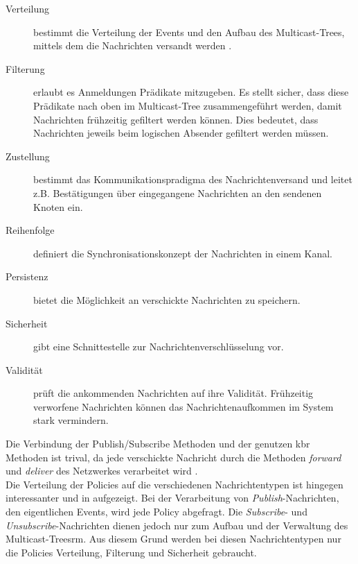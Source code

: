 \begin{description}
\item[Verteilung] bestimmt die Verteilung der Events und den Aufbau des Multicast-Trees, mittels dem die Nachrichten versandt werden \cite{KostasKatrinis2005}.
\item[Filterung] erlaubt es Anmeldungen Prädikate mitzugeben. Es stellt sicher, dass diese Prädikate nach oben im Multicast-Tree zusammengeführt werden, damit Nachrichten frühzeitig gefiltert werden können. Dies bedeutet, dass Nachrichten jeweils beim logischen Absender gefiltert werden müssen.
\item[Zustellung] bestimmt das Kommunikationspradigma des Nachrichtenversand und leitet z.B. Bestätigungen über eingegangene Nachrichten an den sendenen Knoten ein.
\item[Reihenfolge] definiert die Synchronisationskonzept der Nachrichten in einem Kanal.
\item[Persistenz] bietet die Möglichkeit an verschickte Nachrichten zu speichern.
\item[Sicherheit] gibt eine Schnittestelle zur Nachrichtenverschlüsselung vor.
\item[Validität] prüft die ankommenden Nachrichten auf ihre Validität. Frühzeitig verworfene Nachrichten können das Nachrichtenaufkommen im System stark vermindern.
\end{description}

Die Verbindung der Publish/Subscribe Methoden und der genutzen \ac{kbr} Methoden ist trival, da jede verschickte Nachricht durch die Methoden \emph{forward} und \emph{deliver} des Netzwerkes verarbeitet wird \cite{Dabek2003Towards}.\\
Die Verteilung der Policies auf die verschiedenen Nachrichtentypen ist hingegen interessanter und in  aufgezeigt. Bei der Verarbeitung von \emph{Publish}-Nachrichten, den eigentlichen Events, wird jede Policy abgefragt. Die \emph{Subscribe}- und \emph{Unsubscribe}-Nachrichten dienen jedoch nur zum Aufbau und der Verwaltung des Multicast-Treesrm. Aus diesem Grund werden bei diesen Nachrichtentypen nur die Policies Verteilung, Filterung und Sicherheit gebraucht.

